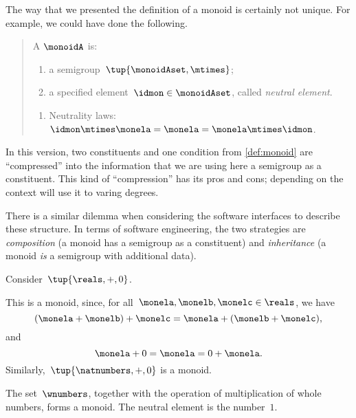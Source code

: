 \begin{remark}
	The way that we presented the definition of a monoid is certainly not unique.
	For example, we could have done the following.
	\begin{quote}
		A \emph{} $\monoidA$ is:
		\begin{body}
			\constit
			\begin{enumerate}
				\item a semigroup~$\tup{\monoidAset, \mtimes}$;
				\item a specified element~$\idmon\in \monoidAset$, called \emph{neutral element}.
			\end{enumerate}
			\condit
			\begin{enumerate}
				\item Neutrality laws:~$\idmon\mtimes \monela= \monela= \monela \mtimes \idmon$.
			\end{enumerate}
		\end{body}
	\end{quote}
	In this version, two constituents and one condition from \cref{def:monoid} are ``compressed'' into the information that we are using here a semigroup as a constituent.
	This kind of ``compression'' has its pros and cons; depending on the context will use it to varing degrees.

	There is a similar dilemma when considering the software interfaces to describe these structure.
	In terms of software engineering, the two strategies are \emph{composition} (a monoid has a semigroup as a constituent) and \emph{inheritance} (a monoid \emph{is} a semigroup with additional data).

\end{remark}

\begin{example}
	Consider~$\tup{\reals,+,0}$.

	This is a monoid, since, for all~$\monela,\monelb, \monelc \in \reals$, we have
	\begin{equation*}
		(\monela+\monelb)
		+\monelc=\monela+(\monelb+\monelc),
	\end{equation*}
	and
	\begin{equation*}
		\monela+0=\monela=0+\monela.
	\end{equation*}
	Similarly,~$\tup{\natnumbers, +,0}$ is a monoid.
\end{example}

\begin{example}
	The set~$\wnumbers$, together with the operation of multiplication of whole numbers, forms a monoid.
	The neutral element is the number~$1$.
\end{example}

